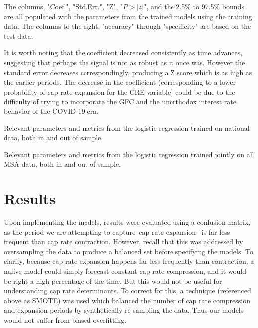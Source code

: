 \documentclass[jrfm,article,submit,oneauthor,pdftex]{Definitions/mdpi}
\begin{document}
The columns, "Coef.", "Std.Err.", "Z", "$P>|z|$", and the 2.5\% to 97.5\% bounds are all populated with the parameters from the trained models using the training data. The columns to the right, "accuracy" through "specificity" are based on the test data. 

It is worth noting that the coefficient decreased consistently as time advances, suggesting that perhaps the signal is not as robust as it once was. However the standard error decreases correspondingly, producing a Z score which is as high as the earlier periods. The decrease in the coefficient (corresponding to a lower probability of cap rate expansion for the CRE variable) could be due to the difficulty of trying to incorporate the GFC and the unorthodox interest rate behavior of the COVID-19 era. 

\begin{table}[H] 
\caption{Relevant parameters and metrics from the logistic regression trained on national data, both in and out of sample.\label{tab1}}
\end{table}

\begin{table}[H] 
\caption{Relevant parameters and metrics from the logistic regression trained jointly on all MSA data, both in and out of sample.\label{tab1}}
\end{table}

\section{Results}

Upon implementing the models, results were evaluated using a confusion matrix, as the period we are attempting to capture--cap rate expansion-- is far less frequent than cap rate contraction. However, recall that  this was addressed by oversampling the data to produce a balanced set before specifying the models. To clarify, because cap rate expansion happens far less frequently than contraction, a naiive model could simply forecast constant cap rate compression, and it would be right a high percentage of the time. But this would not be useful for understanding cap rate determinants. To correct for this, a technique (referenced above as SMOTE) was used which balanced the number of cap rate compression and expansion periods by synthetically re-sampling the data. Thus our models would not suffer from biased overfitting.  
\end{document}
